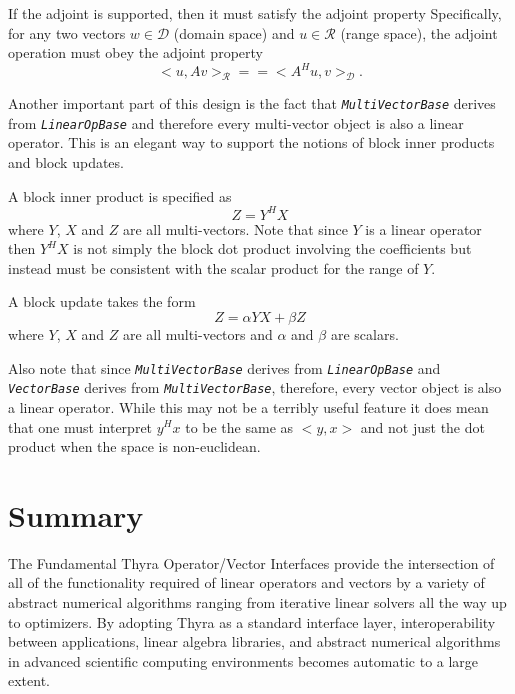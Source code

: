 \documentclass[pdf,ps2pdf,11pt]{SANDreport}
\begin{document}
If the adjoint is supported, then it must satisfy the adjoint property
Specifically, for any two vectors $w\in\mathcal{D}$ (domain space) and
$u\in\mathcal{R}$ (range space), the adjoint operation must obey the adjoint
property
\[
  <u,A v>_{\mathcal{R}} =\!= <A^H u, v>_{\mathcal{D}}.
\]


Another important part of this design is the fact that
{}\texttt{\textit{Multi\-Vector\-Base}} derives from
{}\texttt{\textit{Linear\-Op\-Base}} and therefore every multi-vector object
is also a linear operator.  This is an elegant way to support the notions of
block inner products and block updates.

A block inner product is specified as
\[
Z = Y^H X
\]
where $Y$, $X$ and $Z$ are all multi-vectors.  Note that since $Y$ is a linear
operator then $Y^H X$ is not simply the block dot product involving the
coefficients but instead must be consistent with the scalar product for the
range of $Y$.

A block update takes the form
\[
Z =\alpha Y X + \beta Z
\]
where $Y$, $X$ and $Z$ are all multi-vectors and $\alpha$ and $\beta$ are
scalars.

Also note that since {}\texttt{\textit{Multi\-Vector\-Base}} derives from
{}\texttt{\textit{Linear\-Op\-Base}} and {}\texttt{\textit{Vector\-Base}}
derives from {}\texttt{\textit{Multi\-Vector\-Base}}, therefore, every vector
object is also a linear operator.  While this may not be a terribly useful
feature it does mean that one must interpret $y^H x$ to be the same as $<y,x>$
and not just the dot product when the space is non-euclidean.

%
\section{Summary}
%

The Fundamental Thyra Operator/Vector Interfaces provide the intersection of
all of the functionality required of linear operators and vectors by a variety
of abstract numerical algorithms ranging from iterative linear solvers all the
way up to optimizers.  By adopting Thyra as a standard interface layer,
interoperability between applications, linear algebra libraries, and abstract
numerical algorithms in advanced scientific computing environments becomes
automatic to a large extent.

%
\clearpage
\providecommand*{\phantomsection}{}
\phantomsection
{}


\end{document}
